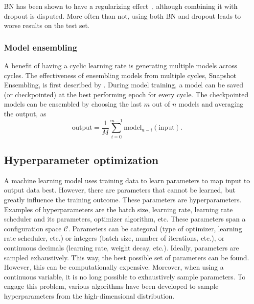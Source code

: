 BN has been shown to have a regularizing effect~, although combining it with dropout is disputed.
More often than not, using both BN and dropout leads to worse results on the test set.

\subsubsection{Model ensembling}\label{subsec:model_ensembling}
A benefit of having a cyclic learning rate is generating multiple models across cycles.
The effectiveness of ensembling models from multiple cycles, Snapshot Ensembling, is first described by \textcite{Huang2017}.
During model training, a model can be saved (or checkpointed) at the best performing epoch for every cycle.
The checkpointed models can be ensembled by choosing the last $m$ out of $n$ models and averaging the output, as
\begin{equation}
    \mathrm{output} = \frac{1}{M} \sum_{i=0}^{m-1} \mathrm{model}_{n-i}(\mathrm{input}).
\end{equation}


\subsection{Hyperparameter optimization}\label{sec:hparam}

A machine learning model uses training data to learn parameters to map input to output data best.
However, there are parameters that cannot be learned, but greatly influence the training outcome.
These parameters are hyperparameters.
Examples of hyperparameters are the batch size, learning rate, learning rate scheduler and its parameters, optimizer algorithm, etc.
These parameters span a configuration space $\mathcal{C}$.
Parameters can be categoral (type of optimizer, learning rate scheduler, etc.) or integers (batch size, number of iterations, etc.), or continuous decimals (learning rate, weight decay, etc.).
Ideally, parameters are sampled exhaustively.
This way, the best possible set of parameters can be found.
However, this can be computationally expensive.
Moreover, when using a continuous variable, it is no long possible to exhaustively sample parameters.
To engage this problem, various algorithms have been developed to sample hyperparameters from the high-dimensional distribution.

